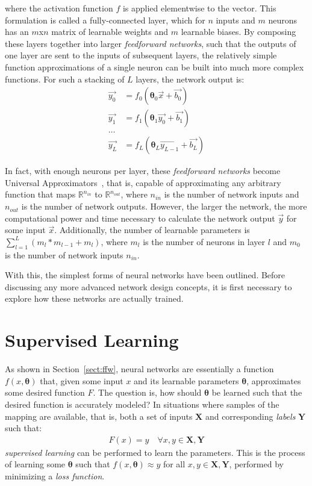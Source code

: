 \noindent where the activation function $f$ is applied elementwise to the vector.
This formulation is called a fully-connected layer, which for $n$ inputs and $m$ neurons has an $m$x$n$ matrix
of learnable weights and $m$ learnable biases. By composing these layers together into larger \textit{feedforward networks},
such that the outputs of one layer are sent to the inputs of subsequent layers, the relatively simple
function approximations of a single neuron can be built into much more complex functions. For such a stacking of $L$ layers, the network
output is:
\begin{align*}
	\vec{y_0}&= f_0(\mathbf{\theta}_0 \vec{x} + \vec{b_0}) \\
	\vec{y_1} &= f_1(\mathbf{\theta}_1\vec{y_0} + \vec{b_1}) \\
	\dots \\
	\vec{y_L} &= f_L(\mathbf{\theta}_L\vec{y_{L-1}} + \vec{b_L})
\end{align*}

In fact, with enough neurons per layer, these \textit{feedforward networks} become Universal
Approximators~\citep{stinchcombe1989}, that is, capable of approximating any arbitrary function that maps $\mathbb{R}^{n_{in}}$ to
$\mathbb{R}^{n_{out}}$, where $n_{in}$ is the number of network inputs and $n_{out}$ is the number of network outputs. However, the larger the network, the more computational power and time
necessary to calculate the network output $\vec{y}$ for some input $\vec{x}$.
Additionally, the number of learnable parameters is $\sum_{l=1}^L (m_l * m_{l-1} + m_l)$, where $m_l$
is the number of neurons in layer $l$ and $m_0$ is the number of network inputs $n_{in}$.

With this, the simplest forms of neural networks have been outlined. Before discussing any more advanced network
design concepts, it is first necessary to explore how these networks are actually trained.

\section{Supervised Learning} \label{sect:nn_train_start}
As shown in Section~\ref{sect:ffw}, neural networks are essentially a function $f(x, \mathbf{\theta})$ that,
given some input $x$ and its learnable parameters $\mathbf{\theta}$, approximates some desired function $F$.
The question is, how should $\mathbf{\theta}$ be learned such that the desired function is accurately modeled? In situations where
samples of the mapping are available, that is, both a set of inputs $\mathbf{X}$ and corresponding \textit{labels} $\mathbf{Y}$ such that:
\begin{align}
	F(x) = y \quad \forall x,y \in \mathbf{X}, \mathbf{Y}
\end{align}
\textit{supervised learning} can be performed to learn the
parameters. This is the process of learning some $\mathbf{\theta}$ such that $f(x, \mathbf{\theta}) \approx y$ for all $x,y \in \mathbf{X}, \mathbf{Y}$,
performed by minimizing a \textit{loss function}.

